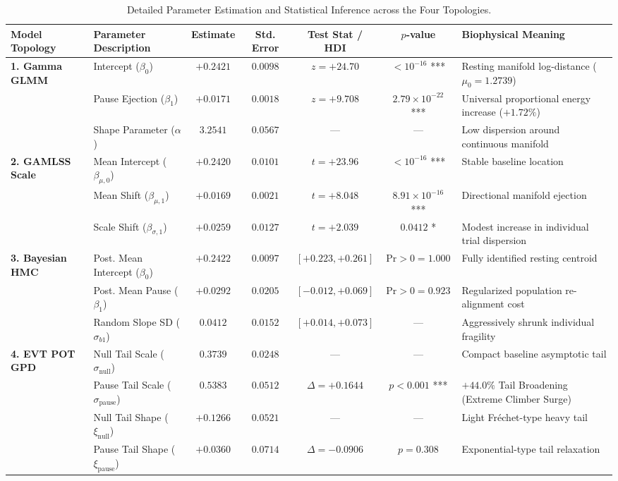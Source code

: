 \documentclass[11pt,twoside,a4paper]{article}
\begin{document}
\begin{table}[H]
\centering
\caption{Detailed Parameter Estimation and Statistical Inference across the Four Topologies.}
\label{tab:parameter_ledger}
\vspace{0.4em}
\begin{adjustbox}{width=\textwidth,center}
\begin{tabular}{l l c c c c l}
\toprule
\textbf{Model Topology} & \textbf{Parameter Description} & \textbf{Estimate} & \textbf{Std. Error} & \textbf{Test Stat / HDI} & \textbf{$p$-value} & \textbf{Biophysical Meaning} \\
\midrule
\textbf{1. Gamma GLMM} & Intercept ($\beta_0$) & $+0.2421$ & $0.0098$ & $z = +24.70$ & $< 10^{-16}$ *** & Resting manifold log-distance ($\mu_0 = 1.2739$) \\
& Pause Ejection ($\beta_1$) & $+0.0171$ & $0.0018$ & $z = +9.708$ & $2.79 \times 10^{-22}$ *** & Universal proportional energy increase ($+1.72\%$) \\
& Shape Parameter ($\alpha$) & $3.2541$ & $0.0567$ & --- & --- & Low dispersion around continuous manifold \\
\midrule
\textbf{2. GAMLSS Scale} & Mean Intercept ($\beta_{\mu,0}$) & $+0.2420$ & $0.0101$ & $t = +23.96$ & $< 10^{-16}$ *** & Stable baseline location \\
& Mean Shift ($\beta_{\mu,1}$) & $+0.0169$ & $0.0021$ & $t = +8.048$ & $8.91 \times 10^{-16}$ *** & Directional manifold ejection \\
& Scale Shift ($\beta_{\sigma,1}$) & $+0.0259$ & $0.0127$ & $t = +2.039$ & $0.0412$ * & Modest increase in individual trial dispersion \\
\midrule
\textbf{3. Bayesian HMC} & Post. Mean Intercept ($\beta_0$) & $+0.2422$ & $0.0097$ & $[+0.223, +0.261]$ & $\text{Pr} > 0 = 1.000$ & Fully identified resting centroid \\
& Post. Mean Pause ($\beta_1$) & $+0.0292$ & $0.0205$ & $[-0.012, +0.069]$ & $\text{Pr} > 0 = 0.923$ & Regularized population re-alignment cost \\
& Random Slope SD ($\sigma_{b1}$) & $0.0412$ & $0.0152$ & $[+0.014, +0.073]$ & --- & Aggressively shrunk individual fragility \\
\midrule
\textbf{4. EVT POT GPD} & Null Tail Scale ($\sigma_{\text{null}}$) & $0.3739$ & $0.0248$ & --- & --- & Compact baseline asymptotic tail \\
& Pause Tail Scale ($\sigma_{\text{pause}}$) & $0.5383$ & $0.0512$ & $\Delta = +0.1644$ & $p < 0.001$ *** & $+44.0\%$ Tail Broadening (Extreme Climber Surge) \\
& Null Tail Shape ($\xi_{\text{null}}$) & $+0.1266$ & $0.0521$ & --- & --- & Light Fréchet-type heavy tail \\
& Pause Tail Shape ($\xi_{\text{pause}}$) & $+0.0360$ & $0.0714$ & $\Delta = -0.0906$ & $p = 0.308$ & Exponential-type tail relaxation \\
\bottomrule
\end{tabular}
\end{adjustbox}
\end{table}
\end{document}
